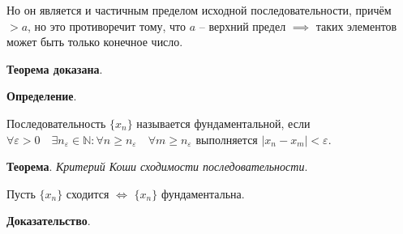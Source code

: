\documentclass{article}
\newcommand{\parspace}{\vspace{10pt}}
\theoremstyle{break}
\begin{document}
Но он является и частичным пределом исходной последовательности, причём $> a$, но
это противоречит тому, что $a$ -- верхний предел $\implies$ таких элементов может
быть только конечное число.

\textbf{Теорема доказана}.

\parspace

\textbf{Определение}.

Последовательность $\{x_n\}$ называется фундаментальной, если 
$\forall \varepsilon > 0 \quad \exists n_\varepsilon \in \mathbb{N}:
\forall n \ge n_\varepsilon \quad \forall m \ge n_\varepsilon$
выполняется $|x_n - x_m| < \varepsilon$.

\parspace

\textbf{Теорема}. \textit{Критерий Коши сходимости последовательности}.

Пусть $\{x_n\}$ сходится $\Leftrightarrow$ $\{x_n\}$ фундаментальна.

\textbf{Доказательство}.
\end{document}
